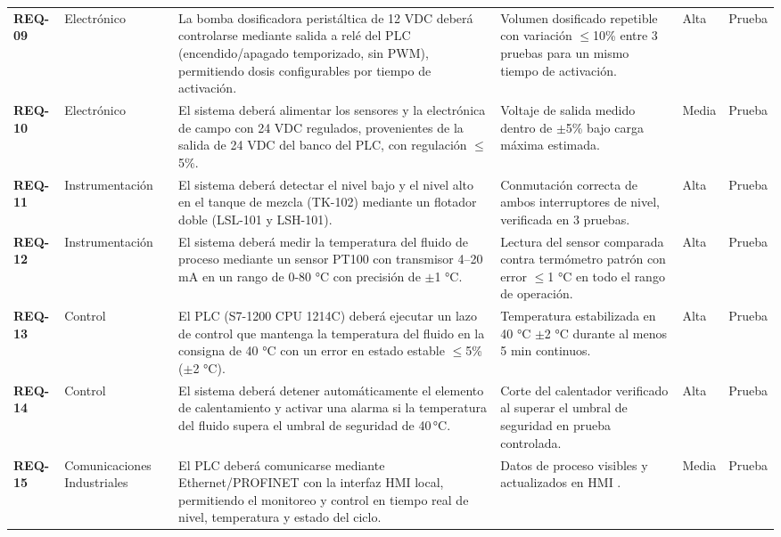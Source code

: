 \begin{longtable}{
  >{\bfseries}p{\colID}
  p{\colCat}
  p{\colReq}
  p{\colCrit}
  p{\colPrio}
  p{\colVer}
}
REQ-09 & Electrónico & La bomba dosificadora peristáltica de 12 VDC deberá controlarse mediante salida a relé del PLC (encendido/apagado temporizado, sin PWM), permitiendo dosis configurables por tiempo de activación. & Volumen dosificado repetible con variación $\leq$10\% entre 3 pruebas para un mismo tiempo de activación. & Alta & Prueba \\[3pt]

REQ-10 & Electrónico & El sistema deberá alimentar los sensores y la electrónica de campo con 24 VDC regulados, provenientes de la salida de 24 VDC del banco del PLC, con regulación $\leq$5\%. & Voltaje de salida medido dentro de $\pm$5\% bajo carga máxima estimada. & Media & Prueba \\[3pt]

REQ-11 & Instrumentación & El sistema deberá detectar el nivel bajo y el nivel alto en el tanque de mezcla (TK-102) mediante un flotador doble (LSL-101 y LSH-101). & Conmutación correcta de ambos interruptores de nivel, verificada en 3 pruebas. & Alta & Prueba \\[3pt]

REQ-12 & Instrumentación & El sistema deberá medir la temperatura del fluido de proceso mediante un sensor PT100 con transmisor 4--20 mA en un rango de 0-80 °C con precisión de $\pm$1 °C. & Lectura del sensor comparada contra termómetro patrón con error $\leq$1 °C en todo el rango de operación. & Alta & Prueba \\[3pt]

REQ-13 & Control & El PLC (S7-1200 CPU 1214C) deberá ejecutar un lazo de control que mantenga la temperatura del fluido en la consigna de 40 °C con un error en estado estable $\leq$5\% ($\pm$2 °C). & Temperatura estabilizada en 40 °C $\pm$2 °C durante al menos 5 min continuos. & Alta & Prueba \\[3pt]

REQ-14 & Control & El sistema deberá detener automáticamente el elemento de calentamiento y activar una alarma si la temperatura del fluido supera el umbral de seguridad de 40\,°C. & Corte del calentador verificado al superar el umbral de seguridad en prueba controlada. & Alta & Prueba \\[3pt]

REQ-15 & Comunicaciones Industriales & El PLC deberá comunicarse mediante Ethernet/PROFINET con la interfaz HMI local, permitiendo el monitoreo y control en tiempo real de nivel, temperatura y estado del ciclo. & Datos de proceso visibles y actualizados en HMI . & Media & Prueba \\[3pt]


\end{longtable}
